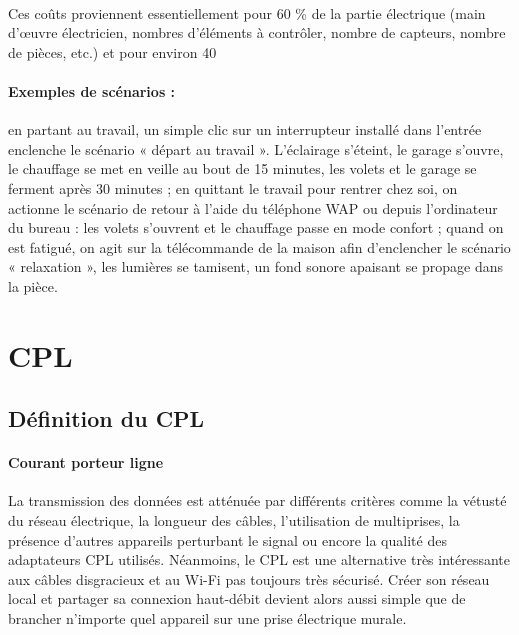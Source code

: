             \paragraph{}
Ces coûts proviennent essentiellement pour 60 \% de la partie électrique (main d’œuvre électricien, nombres d’éléments à contrôler, nombre de capteurs, nombre de pièces, etc.) et pour environ 40 %
            \paragraph{Exemples de scénarios :}
en partant au travail, un simple clic sur un interrupteur installé dans l’entrée enclenche le scénario « départ au travail ».
L’éclairage s’éteint, le garage s’ouvre, le chauffage se met en veille au bout de 15 minutes, les volets et le garage se ferment après 30 minutes ;
en quittant le travail pour rentrer chez soi, on actionne le scénario de retour à l’aide du téléphone WAP ou depuis l’ordinateur du bureau : les volets s’ouvrent et le chauffage passe en mode confort ;
quand on est fatigué, on agit sur la télécommande de la maison afin d’enclencher le scénario « relaxation », les lumières se tamisent, un fond sonore apaisant se propage dans la pièce.


    \section{CPL}
        \subsection{Définition du CPL}
            \paragraph{Courant porteur ligne}
La transmission des données est atténuée par différents critères comme la vétusté du réseau électrique, la longueur des câbles, l'utilisation de multiprises, la présence d'autres appareils perturbant le signal ou encore la qualité des adaptateurs CPL utilisés.
Néanmoins, le CPL est une alternative très intéressante aux câbles disgracieux et au Wi-Fi pas toujours très sécurisé.
Créer son réseau local et partager sa connexion haut-débit devient alors aussi simple que de brancher n'importe quel appareil sur une prise électrique murale.
